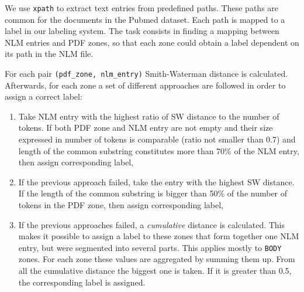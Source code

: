 We use \verb+xpath+ to extract text entries from predefined paths. These paths are common for the documents in the Pubmed dataset. Each path is mapped to a label in our labeling system. The task consists in finding a mapping between NLM entries and PDF zones, so that each zone could obtain a label dependent on its path in the NLM file.

For each pair \verb+(pdf_zone, nlm_entry)+ Smith-Waterman distance
is calculated. Afterwards, for each zone a set of different approaches are followed in order to assign a correct label:
\begin{enumerate}
\item Take NLM entry with the highest ratio of SW distance to the number of tokens. If both PDF zone and NLM entry are not empty and their size expressed in number of tokens is comparable (ratio not smaller than 0.7) and length of the common substring constitutes more than 70\% of the NLM entry, then assign corresponding label,
\item If the previous approach failed, take the entry with the highest SW distance. If the length of the common substring is bigger than 50\% of the number of tokens in the PDF zone, then assign corresponding label,
\item If the previous approaches failed, a \textit{cumulative} distance is calculated. This makes it possible to assign a label to these zones that form together one NLM entry, but were segmented into several parts. This applies mostly to \verb+BODY+ zones. For each zone these values are aggregated by summing them up. From all the cumulative distance the biggest one is taken. If it is greater than 0.5, the corresponding label is assigned.
\end{enumerate}
